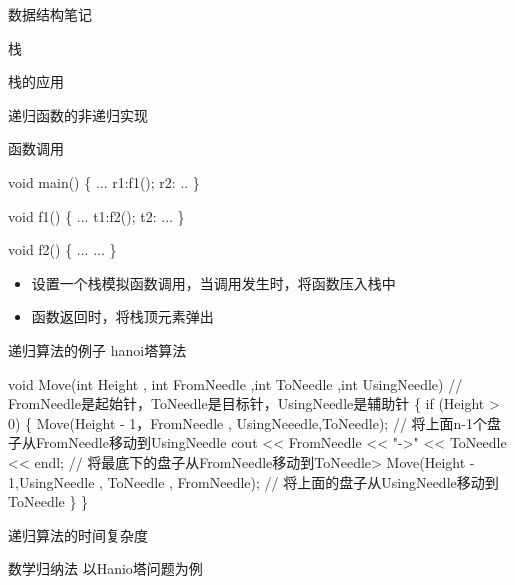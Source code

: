 \documentclass[
  ignorenonframetext,
]{beamer}
\newenvironment{Shaded}{}{}
\newcommand{\NormalTok}[1]{#1}
\providecommand{\tightlist}{%
  \setlength{\itemsep}{0pt}\setlength{\parskip}{0pt}}
\begin{document}
\begin{frame}[fragile]{数据结构笔记}
\begin{block}{栈}
\begin{block}{栈的应用}
\begin{block}{递归函数的非递归实现}
\begin{block}{函数调用}
\begin{Shaded}
\begin{Highlighting}[]
\NormalTok{void main()}
\NormalTok{\{}
\NormalTok{  ...}
\NormalTok{  r1:f1();}
\NormalTok{  r2:}
\NormalTok{  ..}
\NormalTok{\}}

\NormalTok{void f1()}
\NormalTok{\{}
\NormalTok{  ...}
\NormalTok{  t1:f2();}
\NormalTok{  t2:}
\NormalTok{  ...}
\NormalTok{\}}

\NormalTok{void f2()}
\NormalTok{\{}
\NormalTok{  ...}
\NormalTok{  ...}
\NormalTok{\}}
\end{Highlighting}
\end{Shaded}


\begin{itemize}
\tightlist
\item
  设置一个栈模拟函数调用，当调用发生时，将函数压入栈中
\item
  函数返回时，将栈顶元素弹出
\end{itemize}

\begin{block}{递归算法的例子}
\protect{}\label{ux9012ux5f52ux7b97ux6cd5ux7684ux4f8bux5b50}
hanoi塔算法

\begin{Shaded}
\begin{Highlighting}[]
\NormalTok{void Move(int Height , int FromNeedle ,int ToNeedle ,int UsingNeedle) // FromNeedle是起始针，ToNeedle是目标针，UsingNeedle是辅助针}
\NormalTok{\{}
\NormalTok{  if (Height \textgreater{} 0)}
\NormalTok{  \{}
\NormalTok{    Move(Height {-} 1，FromNeedle , UsingNeeedle,ToNeedle); // 将上面n{-}1个盘子从FromNeedle移动到UsingNeedle}
\NormalTok{    cout \textless{}\textless{} FromNeedle \textless{}\textless{} "{-}\textgreater{}" \textless{}\textless{} ToNeedle \textless{}\textless{} endl; // 将最底下的盘子从FromNeedle移动到ToNeedle\textgreater{}}
\NormalTok{    Move(Height {-} 1,UsingNeedle , ToNeedle , FromNeedle); // 将上面的盘子从UsingNeedle移动到ToNeedle}
\NormalTok{  \}}
\NormalTok{\}}
\end{Highlighting}
\end{Shaded}
\end{block}
\end{block}

\begin{block}{递归算法的时间复杂度}
\protect{}\label{ux9012ux5f52ux7b97ux6cd5ux7684ux65f6ux95f4ux590dux6742ux5ea6}
\begin{block}{数学归纳法}
\protect{}\label{ux6570ux5b66ux5f52ux7eb3ux6cd5}
以Hanio塔问题为例


\end{block}
\end{block}
\end{block}
\end{block}
\end{block}
\end{frame}
\end{document}
